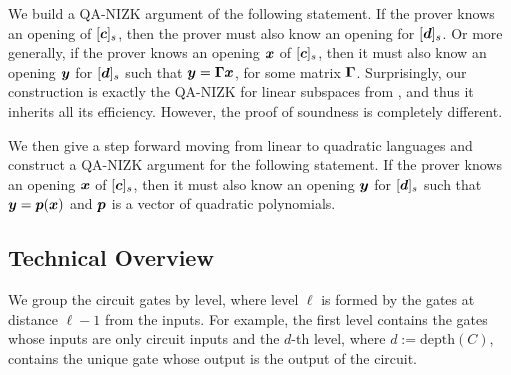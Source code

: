 We build a QA-NIZK argument of the following statement. If the prover knows an opening of $[{\boldsymbol{c}}]_s$, then the prover must also know an opening for $[{\boldsymbol{d}}]_s$. Or more generally, if the prover knows an opening ${\boldsymbol{x}}$ of $[{\boldsymbol{c}}]_s$, then it must also know an opening ${\boldsymbol{y}}$ for $[{\boldsymbol{d}}]_s$ such that ${\boldsymbol{y}}=\mathbf{{\Gamma}}{\boldsymbol{x}}$, for some matrix $\mathbf{{\Gamma}}$. Surprisingly, our construction is exactly the QA-NIZK for linear subspaces from \cite{C:JutRoy14,EC:KilWee15,AC:GonHevRaf15}, and thus it inherits all its efficiency. However, the proof of soundness is completely different.

We then give a step forward moving from linear to quadratic languages and construct a QA-NIZK argument for the following statement. If the prover knows an opening ${\boldsymbol{x}}$ of $[{\boldsymbol{c}}]_s$, then it must also know an opening ${\boldsymbol{y}}$ for $[{\boldsymbol{d}}]_s$ such that ${\boldsymbol{y}}={\boldsymbol{p}}({\boldsymbol{x}})$ and ${\boldsymbol{p}}$ is a vector of quadratic polynomials.


\subsection{Technical Overview}
We group the circuit gates by level, where level $\ell$ is formed by the gates at distance $\ell-1$ from the inputs. For example, the first level contains the gates whose inputs are only circuit inputs and the $d$-th level, where $d:=\mathrm{depth}({C})$, contains the unique gate whose output is the output of the circuit.

